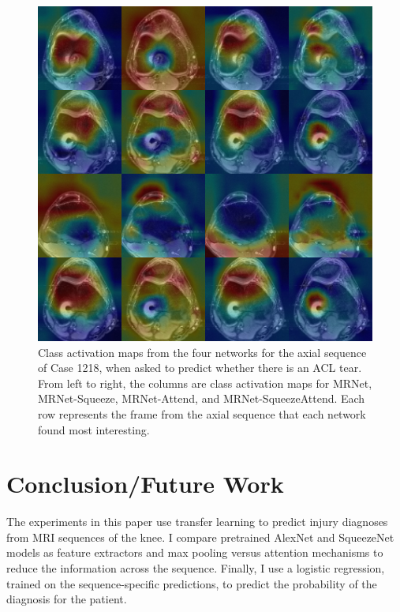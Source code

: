 \documentclass[10pt,twocolumn,letterpaper]{article}
\begin{document}
\begin{figure}[h!]
\begin{center}
\includegraphics[width=0.9\linewidth]{../images/cams/4x4.png}
\end{center}
   \caption{Class activation maps from the four networks for the axial sequence of Case 1218, when asked to predict whether there is an ACL tear. From left to right, the columns are class activation maps for MRNet, MRNet-Squeeze, MRNet-Attend, and MRNet-SqueezeAttend. Each row represents the frame from the axial sequence that each network found most interesting.}
\label{fig:cam_4x4}
\end{figure}


\section{Conclusion/Future Work} %

The experiments in this paper use transfer learning to predict injury diagnoses from MRI sequences of the knee. I compare pretrained AlexNet and SqueezeNet models as feature extractors and max pooling versus attention mechanisms to reduce the information across the sequence. Finally, I use a logistic regression, trained on the sequence-specific predictions, to predict the probability of the diagnosis for the patient.
\end{document}
